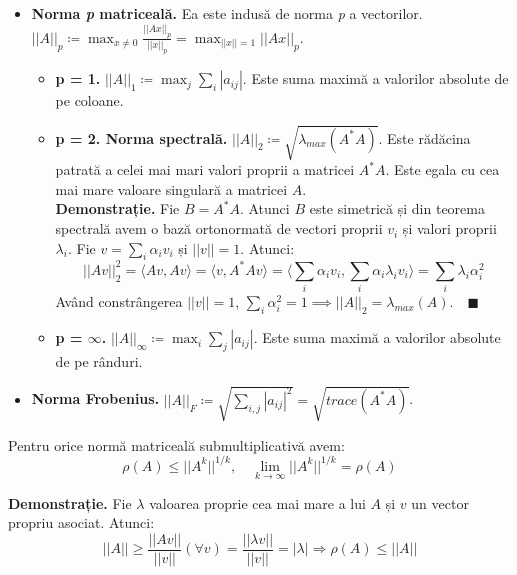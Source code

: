 \documentclass{exam}
\begin{document}
\begin{itemize}
	\item \textbf{Norma \textit{p} matriceală.} Ea este indusă de norma \textit{p} a vectorilor. \\
	      $||A||_p \coloneq \max_{x \neq 0} \frac{||Ax||_p}{||x||_p} = \max_{||x|| = 1} ||Ax||_p$.
	      \begin{itemize}
		      \item \textbf{p = 1.} $||A||_1 \coloneq \max_j \sum_i |a_{ij}|$. Este suma maximă a valorilor absolute
		            de pe coloane.
		      \item \textbf{p = 2. Norma spectrală.} $||A||_2 \coloneq \sqrt{\lambda_{max}(A^*A)}$.
		            Este rădăcina patrată a celei mai mari valori proprii a matricei $A^*A$.
		            Este egala cu cea mai mare valoare singulară a matricei $A$. \\
		            \textbf{Demonstrație.} Fie $B = A^*A$. Atunci $B$ este
		            simetrică și din teorema spectrală avem o bază ortonormată
		            de vectori proprii $v_i$ și valori proprii $\lambda_i$.
		            Fie $v = \sum_i \alpha_i v_i$ și $||v|| = 1$. Atunci:
		            \begin{equation*}
			            ||Av||^2_2 = \langle Av, Av \rangle = \langle v, A^*Av \rangle = \langle  \sum_{i} \alpha_i v_i, \sum_{i} \alpha_i \lambda_i v_i \rangle = \sum_{i} \lambda_i \alpha_i^2
		            \end{equation*}
		            Având constrângerea $||v|| = 1$, $\sum_{i} \alpha_i^2 = 1 \implies ||A||_2 = \lambda_{max}(A). \quad \blacksquare$

		      \item \textbf{p = $\infty$.} $||A||_{\infty} \coloneq \max_i \sum_j |a_{ij}|$. Este suma maximă a valorilor
		            absolute de pe rânduri.
	      \end{itemize}
	\item \textbf{Norma Frobenius.} $||A||_F \coloneq \sqrt{\sum_{i,j} |a_{ij}|^2} = \sqrt{trace(A^*A)}$.
\end{itemize}

Pentru orice normă matriceală submultiplicativă avem:
\begin{equation*}
	\rho(A) \leq ||A^k||^{1/k}, \quad \lim_{k \to \infty} ||A^k||^{1/k} = \rho(A)
\end{equation*}

\textbf{Demonstrație.} Fie $\lambda$ valoarea proprie cea mai mare a lui $A$ și $v$ un vector propriu asociat. Atunci:
\begin{equation*}
	||A|| \geq \frac{||Av||}{||v||} (\forall v) = \frac{||\lambda v||}{||v||} = |\lambda| \Rightarrow \rho(A) \leq ||A||
\end{equation*}
\end{document}
